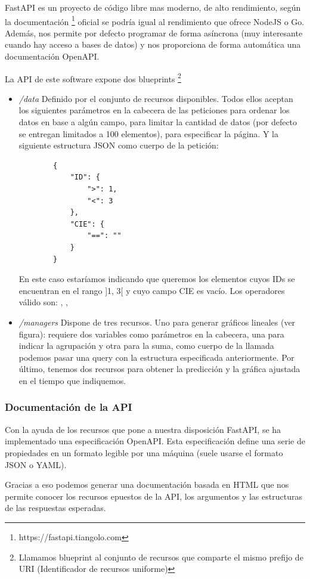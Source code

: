 FastAPI es un proyecto de código libre mas moderno, de alto rendimiento, según la documentación \footnote{https://fastapi.tiangolo.com} oficial se podría igual al rendimiento que ofrece NodeJS o Go. Además, nos permite por defecto programar de forma asíncrona (muy interesante cuando hay acceso a bases de datos) y nos proporciona de forma automática una documentación OpenAPI.

La API de este software expone dos blueprints \footnote{Llamamos blueprint al conjunto de recursos que comparte el mismo prefijo de URI (Identificador de recursos uniforme)}

\begin{itemize}
    \item \textit{/data} Definido por el conjunto de recursos disponibles. Todos ellos aceptan los siguientes parámetros en la cabecera de las peticiones  para ordenar los datos en base a algún campo,  para limitar la cantidad de datos (por defecto se entregan limitados a 100 elementos),  para especificar la página.
    Y la siguiente estructura JSON como cuerpo de la petición:
    \begin{verbatim}
        {
            "ID": {
                ">": 1,
                "<": 3
            },
            "CIE": {
                "==": ""
            }
        }
    \end{verbatim}
    En este caso estaríamos indicando que queremos los elementos cuyos IDs se encuentran en el rango ]1, 3[ y cuyo campo CIE es vacío. Los operadores válido son: \codeword{==}, \codeword{<}, \codeword{>}

    \item \textit{/managers} Dispone de tres recursos. Uno para generar gráficos lineales (ver figura): requiere dos variables como parámetros en la cabecera, una para indicar la agrupación y otra para la suma, como cuerpo de la llamada podemos pasar una query con la estructura especificada anteriormente. Por último, tenemos dos recursos para obtener la predicción y la gráfica ajustada en el tiempo que indiquemos.
\end{itemize}

\subsubsection{Documentación de la API}
Con la ayuda de los recursos que pone a nuestra disposición FastAPI, se ha implementado una especificación OpenAPI. Esta especificación define una serie de propiedades en un formato legible por una máquina (suele usarse el formato JSON o YAML).

Gracias a eso podemos generar una documentación basada en HTML que nos permite conocer los recursos epuestos de la API, los argumentos y las estructuras de las respuestas esperadas. 